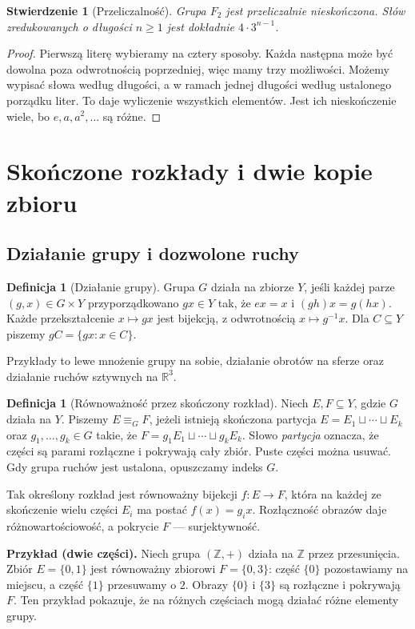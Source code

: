 \documentclass[11pt,a4paper]{article}
\numberwithin{equation}{section}
\theoremstyle{plain}
\newtheorem{stwierdzenie}[twierdzenie]{Stwierdzenie}
\theoremstyle{definition}
\newtheorem{definicja}[twierdzenie]{Definicja}
\theoremstyle{remark}
\newcommand{\R}{\mathbb R}
\newcommand{\Z}{\mathbb Z}
\newcommand{\equivG}{\mathrel{\equiv_G}}
\begin{document}
\begin{stwierdzenie}[Przeliczalność]\label{st:przeliczalnosc-f2}
Grupa $F_2$ jest przeliczalnie nieskończona. Słów zredukowanych o długości $n\ge1$ jest dokładnie $4\cdot3^{n-1}$.
\end{stwierdzenie}
\begin{proof}
Pierwszą literę wybieramy na cztery sposoby. Każda następna może być dowolna poza odwrotnością poprzedniej, więc mamy trzy możliwości. Możemy wypisać słowa według długości, a w ramach jednej długości według ustalonego porządku liter. To daje wyliczenie wszystkich elementów. Jest ich nieskończenie wiele, bo $e,a,a^2,\ldots$ są różne.
\end{proof}

\section{Skończone rozkłady i dwie kopie zbioru}
\subsection{Działanie grupy i dozwolone ruchy}
\begin{definicja}[Działanie grupy]
Grupa $G$ działa na zbiorze $Y$, jeśli każdej parze $(g,x)\in G\times Y$ przyporządkowano $gx\in Y$ tak, że $ex=x$ i $(gh)x=g(hx)$. Każde przekształcenie $x\mapsto gx$ jest bijekcją, z odwrotnością $x\mapsto g^{-1}x$. Dla $C\subseteq Y$ piszemy $gC=\{gx:x\in C\}$.
\end{definicja}
Przykłady to lewe mnożenie grupy na sobie, działanie obrotów na sferze oraz działanie ruchów sztywnych na $\R^3$.
\begin{definicja}[Równoważność przez skończony rozkład]\label{def:rownorozklad}
Niech $E,F\subseteq Y$, gdzie $G$ działa na $Y$. Piszemy $E\equivG F$, jeżeli istnieją skończona partycja $E=E_1\sqcup\cdots\sqcup E_k$ oraz $g_1,\ldots,g_k\in G$ takie, że $F=g_1E_1\sqcup\cdots\sqcup g_kE_k$. Słowo \emph{partycja} oznacza, że części są parami rozłączne i pokrywają cały zbiór. Puste części można usuwać. Gdy grupa ruchów jest ustalona, opuszczamy indeks $G$.
\end{definicja}
Tak określony rozkład jest równoważny bijekcji $f:E\to F$, która na każdej ze skończenie wielu części $E_i$ ma postać $f(x)=g_ix$. Rozłączność obrazów daje różnowartościowość, a pokrycie $F$ --- surjektywność.

\textbf{Przykład (dwie części).} Niech grupa $(\Z,+)$ działa na $\Z$ przez przesunięcia. Zbiór $E=\{0,1\}$ jest równoważny zbiorowi $F=\{0,3\}$: część $\{0\}$ pozostawiamy na miejscu, a część $\{1\}$ przesuwamy o $2$. Obrazy $\{0\}$ i $\{3\}$ są rozłączne i pokrywają $F$. Ten przykład pokazuje, że na różnych częściach mogą działać różne elementy grupy.
\end{document}
